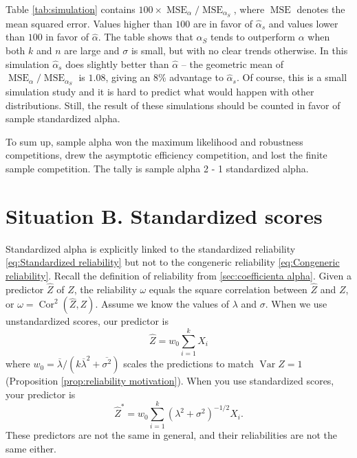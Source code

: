 \documentclass[twoside]{article}
\DeclareMathOperator{\Var}{Var}
\DeclareMathOperator{\Cor}{Cor}
\DeclareMathOperator{\MSE}{MSE}
\begin{document}
Table \ref{tab:simulation} contains $100 \times \MSE_\alpha/\MSE_{\alpha_S}$, where $\MSE$ denotes the mean squared error. Values higher than $100$ are in favor of $\hat{\alpha}_s$ and values lower than $100$ in favor of $\hat{\alpha}$. The table shows that $\alpha_S$ tends to outperform $\alpha$ when both $k$ and $n$ are large and $\sigma$ is small, but with no clear trends otherwise. In this simulation $\hat{\alpha}_s$ does slightly better than $\hat{\alpha}$ -- the geometric mean of $\MSE_\alpha/\MSE_{\alpha_S}$ is $1.08$, giving an $8$\% advantage to $\hat{\alpha}_s$. Of course, this is a small simulation study and it is hard to predict what would happen with other distributions. Still, the result of these simulations should be counted in favor of sample standardized alpha.

To sum up, sample alpha won the maximum likelihood and robustness competitions, drew the asymptotic efficiency competition, and lost the finite sample competition. The tally is sample alpha 2 - 1 standardized alpha. 



\section{Situation B. Standardized scores}
\label{sec:argument B}

Standardized alpha is explicitly linked to the standardized reliability \eqref{eq:Standardized reliability} but not to the congeneric reliability \eqref{eq:Congeneric reliability}. Recall the definition of reliability from
\cref{sec:coefficienta alpha}. Given a predictor $\hat{Z}$ of $Z$, the
reliability $\omega$ equals the square correlation between $\hat{Z}$
and $Z$, or $\omega=\Cor^{2}(\hat{Z},Z)$. Assume
we know the values of $\lambda$ and $\sigma$. When we use unstandardized
scores, our predictor is 
\begin{equation*}
\hat{Z}=w_{0}\sum_{i=1}^{k}X_{i}
\end{equation*}
where $w_{0}=\overline{\lambda}/(k\overline{\lambda}^{2}+\overline{\sigma^{2}})$ scales the predictions to match $\Var Z=1$ (Proposition \ref{prop:reliability motivation}). When you use standardized
scores, your predictor is $$\hat{Z}^{*}=w_{0}\sum_{i=1}^{k}(\lambda^{2}+\sigma^{2})^{-1/2}X_{i}.$$
These predictors are not the same in general, and their reliabilities are not
the same either.
\end{document}
